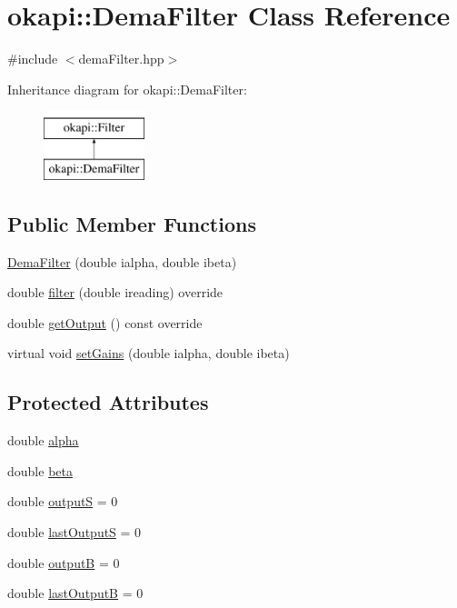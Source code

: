 \hypertarget{classokapi_1_1DemaFilter}{}\section{okapi\+::Dema\+Filter Class Reference}
\label{classokapi_1_1DemaFilter}


{\ttfamily \#include $<$dema\+Filter.\+hpp$>$}

Inheritance diagram for okapi\+::Dema\+Filter\+:\begin{figure}[H]
\begin{center}
\leavevmode
\includegraphics[height=2.000000cm]{classokapi_1_1DemaFilter}
\end{center}
\end{figure}
\subsection*{Public Member Functions}
\begin{DoxyCompactItemize}
\item 
\mbox{\hyperlink{classokapi_1_1DemaFilter_ad5027a998ad5864b890c4aa04d6d54c3}{Dema\+Filter}} (double ialpha, double ibeta)
\item 
double \mbox{\hyperlink{classokapi_1_1DemaFilter_a2d0eb2feae37ceacc865023ac4997ff1}{filter}} (double ireading) override
\item 
double \mbox{\hyperlink{classokapi_1_1DemaFilter_a2dba33231bb71e16d13adbcefefed425}{get\+Output}} () const override
\item 
virtual void \mbox{\hyperlink{classokapi_1_1DemaFilter_a714fcbd4a8792adfae65fea048cedd98}{set\+Gains}} (double ialpha, double ibeta)
\end{DoxyCompactItemize}
\subsection*{Protected Attributes}
\begin{DoxyCompactItemize}
\item 
double \mbox{\hyperlink{classokapi_1_1DemaFilter_ab28fcb9de16e8df8c510e42b6be99323}{alpha}}
\item 
double \mbox{\hyperlink{classokapi_1_1DemaFilter_ae3ed95c39828a178e68dd72078ddbfcc}{beta}}
\item 
double \mbox{\hyperlink{classokapi_1_1DemaFilter_a546334c52b5e8d8f7463e5c4b5f567cc}{outputS}} = 0
\item 
double \mbox{\hyperlink{classokapi_1_1DemaFilter_a871f1d0708279cae7a395d56838ee2cb}{last\+OutputS}} = 0
\item 
double \mbox{\hyperlink{classokapi_1_1DemaFilter_a3b5321ef933fe42ad34176bbd7ee153a}{outputB}} = 0
\item 
double \mbox{\hyperlink{classokapi_1_1DemaFilter_ac2aa6ed56ee0120dcca8e12057b15a70}{last\+OutputB}} = 0
\end{DoxyCompactItemize}


